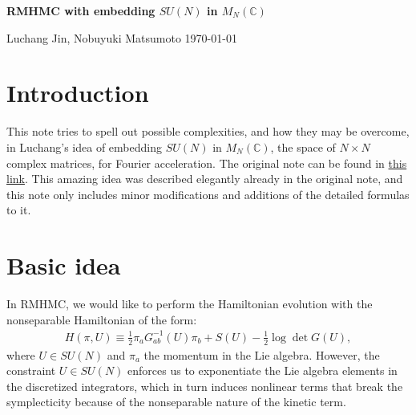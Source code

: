 \documentclass[12pt]{article}
\begin{document}

\begin{center}
  {\Large \bf
    RMHMC with embedding $SU(N)$
    in $M_N(\mathbb{C})$
  }
  \vspace{1.0cm}

  \centerline{
    Luchang Jin,
    Nobuyuki Matsumoto
    { \today }%
  }


\end{center}



\tableofcontents
\setcounter{footnote}{0}


\section{Introduction}
\label{sec:intro}

This note tries to spell out possible complexities,
and how they may be overcome,
in Luchang's idea of
embedding $SU(N)$ in $M_N(\mathbb{C})$,
the space of $N\times N$ complex matrices,
for Fourier acceleration.
The original note can be found in
\href{https://rbc.phys.columbia.edu/rbc_ukqcd/individual_postings/luchang/notes/2024-07-11-rmhmc-alg/note-v4.html}{this link}.
This amazing idea was described elegantly already in the original note,
and this note only includes minor modifications and additions of the detailed formulas to it.


\section{Basic idea}
\label{sec:idea}

In RMHMC, we would like to perform the Hamiltonian evolution with the
nonseparable Hamiltonian of the form:
\begin{align}
  H(\pi, U) \equiv \frac{1}{2} \pi_a G_{ab}^{-1}(U) \pi_b + S(U)
  - \frac{1}{2} \log \det G(U),
\end{align}
where $U \in SU(N)$ and $\pi_a$ the momentum in the Lie algebra.
However, the constraint $U \in SU(N)$
enforces us to exponentiate the Lie algebra elements
in the discretized integrators,
which in turn induces nonlinear terms that break the symplecticity
because of the nonseparable nature of the kinetic term.
\end{document}
